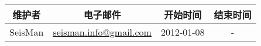 \section*{}

\begin{table}[H]
\centering
\begin{tabular}{cccc}
\toprule
维护者      & 电子邮件                               &   开始时间    &   结束时间    \\
\midrule
SeisMan     & \small{\url{seisman.info@gmail.com}}   &  2012-01-08   &   -           \\
\bottomrule
\end{tabular}
\end{table}
